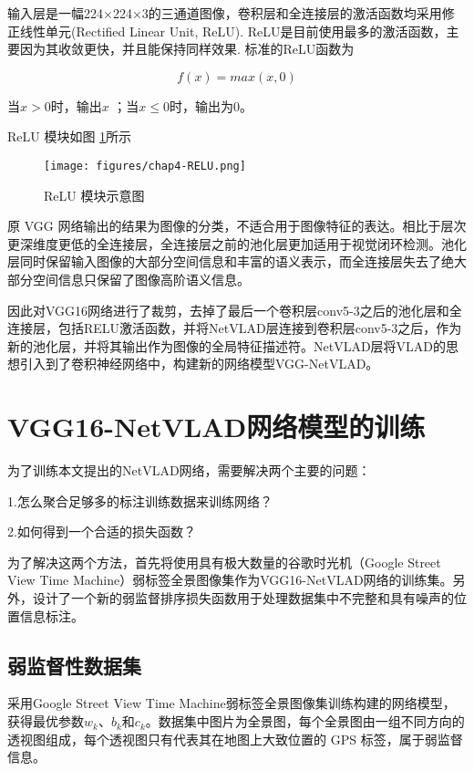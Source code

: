 输入层是一幅224×224×3的三通道图像，卷积层和全连接层的激活函数均采用修正线性单元(Rectified Linear Unit, ReLU). ReLU是目前使用最多的激活函数，主要因为其收敛更快，并且能保持同样效果. 标准的ReLU函数为

\begin{equation}
f(x) = max(x,0)
\end{equation}

当$x>0$时，输出$x$ ；当$x \leq 0$时，输出为0。 

ReLU 模块如图 \ref{relu_mod}所示

\begin{figure}[htbp]
	\centering
	\texttt{[image: figures/chap4-RELU.png]}
	\caption{ReLU 模块示意图}
	\label{relu_mod}
\end{figure}

原 VGG 网络输出的结果为图像的分类，不适合用于图像特征的表达。相比于层次更深维度更低的全连接层，全连接层之前的池化层更加适用于视觉闭环检测。池化层同时保留输入图像的大部分空间信息和丰富的语义表示，而全连接层失去了绝大部分空间信息只保留了图像高阶语义信息。

因此对VGG16网络进行了裁剪，去掉了最后一个卷积层conv5-3之后的池化层和全连接层，包括RELU激活函数，并将NetVLAD层连接到卷积层conv5-3之后，作为新的池化层，并将其输出作为图像的全局特征描述符。NetVLAD层将VLAD的思想引入到了卷积神经网络中，构建新的网络模型VGG-NetVLAD。


\section{VGG16-NetVLAD网络模型的训练}
为了训练本文提出的NetVLAD网络，需要解决两个主要的问题：

1.怎么聚合足够多的标注训练数据来训练网络？
 
2.如何得到一个合适的损失函数？

为了解决这两个方法，首先将使用具有极大数量的谷歌时光机（Google Street View Time Machine）弱标签全景图像集作为VGG16-NetVLAD网络的训练集。另外，设计了一个新的弱监督排序损失函数用于处理数据集中不完整和具有噪声的位置信息标注。

\subsection{弱监督性数据集}
采用Google Street View Time Machine弱标签全景图像集训练构建的网络模型，获得最优参数$ {w_k} $、$ {b_k} $和$ {c_k} $。数据集中图片为全景图，每个全景图由一组不同方向的透视图组成，每个透视图只有代表其在地图上大致位置的 GPS 标签，属于弱监督信息。

